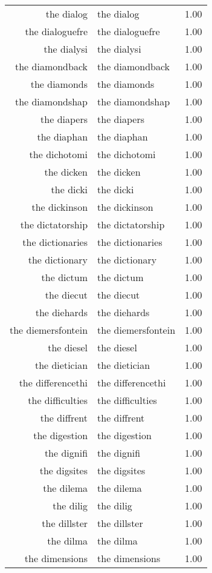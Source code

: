 \begin{table}[ht]
\begin{tabular}{rlr}
  the dialog & the dialog & 1.00 \\ 
  the dialoguefre & the dialoguefre & 1.00 \\ 
  the dialysi & the dialysi & 1.00 \\ 
  the diamondback & the diamondback & 1.00 \\ 
  the diamonds & the diamonds & 1.00 \\ 
  the diamondshap & the diamondshap & 1.00 \\ 
  the diapers & the diapers & 1.00 \\ 
  the diaphan & the diaphan & 1.00 \\ 
  the dichotomi & the dichotomi & 1.00 \\ 
  the dicken & the dicken & 1.00 \\ 
  the dicki & the dicki & 1.00 \\ 
  the dickinson & the dickinson & 1.00 \\ 
  the dictatorship & the dictatorship & 1.00 \\ 
  the dictionaries & the dictionaries & 1.00 \\ 
  the dictionary & the dictionary & 1.00 \\ 
  the dictum & the dictum & 1.00 \\ 
  the diecut & the diecut & 1.00 \\ 
  the diehards & the diehards & 1.00 \\ 
  the diemersfontein & the diemersfontein & 1.00 \\ 
  the diesel & the diesel & 1.00 \\ 
  the dietician & the dietician & 1.00 \\ 
  the differencethi & the differencethi & 1.00 \\ 
  the difficulties & the difficulties & 1.00 \\ 
  the diffrent & the diffrent & 1.00 \\ 
  the digestion & the digestion & 1.00 \\ 
  the dignifi & the dignifi & 1.00 \\ 
  the digsites & the digsites & 1.00 \\ 
  the dilema & the dilema & 1.00 \\ 
  the dilig & the dilig & 1.00 \\ 
  the dillster & the dillster & 1.00 \\ 
  the dilma & the dilma & 1.00 \\ 
  the dimensions & the dimensions & 1.00 \\ 

\end{tabular}
\end{table}
